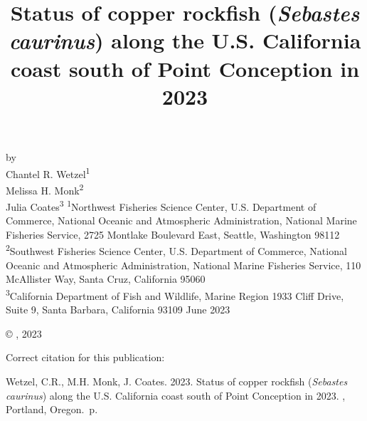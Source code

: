 \documentclass[11pt,
  english,
  letterpaper,
]{article}
\date{}
\newcommand{\trTitle}{Status of copper rockfish (\emph{Sebastes caurinus}) along the U.S. California coast south of Point Conception in 2023}
\newcommand{\trYear}{2023}
\newcommand{\trMonth}{June}
\newcommand{\trAuthsBack}{Wetzel, C.R., M.H. Monk, J. Coates}
\newcommand{\trCitation}{
\begin{hangparas}{1em}{1}
\trAuthsBack{}. \trYear{}. \trTitle{}. \glsentrylong{pfmc}, Portland, Oregon. \pageref{LastPage}{}\,p.
\end{hangparas}}
\newcommand\includegraphicsifexists[2][width=\linewidth]{\IfFileExists{#2}{\texttt{[image: \#2]}}{}}
\begin{document}

\renewcommand*{\thefootnote}{\fnsymbol{footnote}}

\small
\thispagestyle{empty}
\noindent
\begin{center}
\title{Status of copper rockfish (\emph{Sebastes caurinus}) along the U.S. California coast south of Point Conception in 2023}
\vspace{1.5cm}
{\Large\textbf{}}

\includegraphicsifexists[width=4in]{figure_title.png}
\vfill
by\\
Chantel R. Wetzel\textsuperscript{1}\\
Melissa H. Monk\textsuperscript{2}\\
Julia Coates\textsuperscript{3}\vfill
\textsuperscript{1}Northwest Fisheries Science Center, U.S. Department of Commerce, National Oceanic and Atmospheric Administration, National Marine Fisheries Service, 2725 Montlake Boulevard East, Seattle, Washington 98112\\
\textsuperscript{2}Southwest Fisheries Science Center, U.S. Department of Commerce, National Oceanic and Atmospheric Administration, National Marine Fisheries Service, 110 McAllister Way, Santa Cruz, California 95060\\
\textsuperscript{3}California Department of Fish and Wildlife, Marine Region 1933 Cliff Drive, Suite 9, Santa Barbara, California 93109\vfill
\trMonth{} \trYear{}
\end{center}
\clearpage

\thispagestyle{empty}
\vspace*{\fill}
\begin{center}
\copyright{} , \trYear{}\\
\end{center}
\par
\bigskip
\noindent
Correct citation for this publication:
\bigskip
\par
\trCitation{}
\clearpage


\tableofcontents\clearpage
\label{TRlastRoman}
\clearpage
\end{document}
